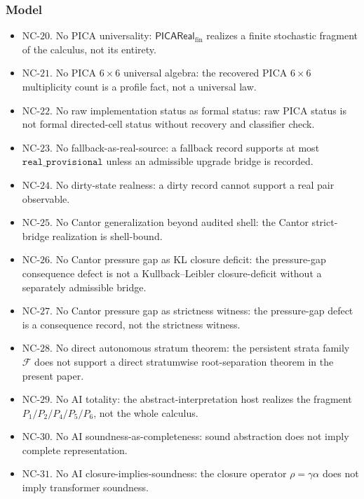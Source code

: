 \documentclass[11pt]{article}
\providecommand{\tightlist}{}
\theoremstyle{definition}
\begin{document}
\subsubsection{Model}

\begin{itemize}
\tightlist
\item
  \(\mathrm{NC}\text{-}20\). No PICA universality: \(\mathsf{PICAReal}_{\mathrm{fin}}\) realizes a finite stochastic fragment of the calculus, not its entirety.
\item
  \(\mathrm{NC}\text{-}21\). No PICA \(6\times 6\) universal algebra: the recovered PICA \(6\times 6\) multiplicity count is a profile fact, not a universal law.
\item
  \(\mathrm{NC}\text{-}22\). No raw implementation status as formal status: raw PICA status is not formal directed-cell status without recovery and classifier check.
\item
  \(\mathrm{NC}\text{-}23\). No fallback-as-real-source: a fallback record supports at most \(\texttt{real\_provisional}\) unless an admissible upgrade bridge is recorded.
\item
  \(\mathrm{NC}\text{-}24\). No dirty-state realness: a dirty record cannot support a real pair observable.
\item
  \(\mathrm{NC}\text{-}25\). No Cantor generalization beyond audited shell: the Cantor strict-bridge realization is shell-bound.
\item
  \(\mathrm{NC}\text{-}26\). No Cantor pressure gap as KL closure deficit: the pressure-gap consequence defect is not a Kullback--Leibler closure-deficit without a separately admissible bridge.
\item
  \(\mathrm{NC}\text{-}27\). No Cantor pressure gap as strictness witness: the pressure-gap defect is a consequence record, not the strictness witness.
\item
  \(\mathrm{NC}\text{-}28\). No direct autonomous stratum theorem: the persistent strata family \(\mathcal F\) does not support a direct stratumwise root-separation theorem in the present paper.
\item
  \(\mathrm{NC}\text{-}29\). No AI totality: the abstract-interpretation host realizes the fragment \(P_{1}/P_{2}/P_{4}/P_{5}/P_{6}\), not the whole calculus.
\item
  \(\mathrm{NC}\text{-}30\). No AI soundness-as-completeness: sound abstraction does not imply complete representation.
\item
  \(\mathrm{NC}\text{-}31\). No AI closure-implies-soundness: the closure operator \(\rho=\gamma\alpha\) does not imply transformer soundness.

\end{itemize}
\end{document}
